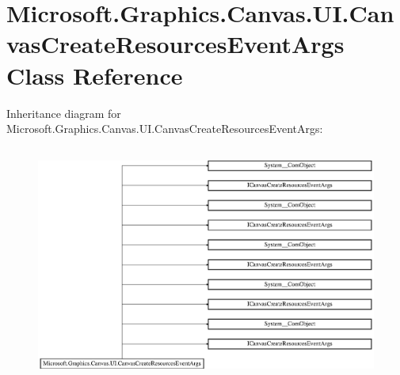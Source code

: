 \hypertarget{class_microsoft_1_1_graphics_1_1_canvas_1_1_u_i_1_1_canvas_create_resources_event_args}{}\section{Microsoft.\+Graphics.\+Canvas.\+U\+I.\+Canvas\+Create\+Resources\+Event\+Args Class Reference}
\label{class_microsoft_1_1_graphics_1_1_canvas_1_1_u_i_1_1_canvas_create_resources_event_args}
Inheritance diagram for Microsoft.\+Graphics.\+Canvas.\+U\+I.\+Canvas\+Create\+Resources\+Event\+Args\+:\begin{figure}[H]
\begin{center}
\leavevmode
\includegraphics[height=7.817258cm]{class_microsoft_1_1_graphics_1_1_canvas_1_1_u_i_1_1_canvas_create_resources_event_args}
\end{center}
\end{figure}

